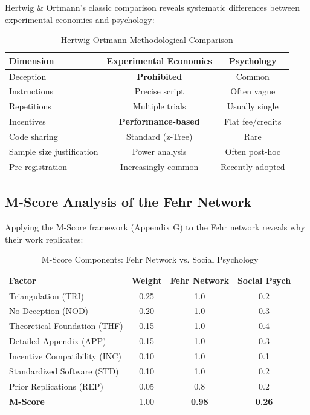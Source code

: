 \documentclass[11pt,a4paper]{article}
\theoremstyle{remark}
\begin{document}
Hertwig \& Ortmann's classic comparison reveals systematic differences between experimental economics and psychology:

\begin{table}[h]
\centering
\caption{Hertwig-Ortmann Methodological Comparison}
\label{tab:hertwig-ortmann}
\begin{tabular}{lcc}
\toprule
\textbf{Dimension} & \textbf{Experimental Economics} & \textbf{Psychology} \\
\midrule
Deception & \textbf{Prohibited} & Common \\
Instructions & Precise script & Often vague \\
Repetitions & Multiple trials & Usually single \\
Incentives & \textbf{Performance-based} & Flat fee/credits \\
Code sharing & Standard (z-Tree) & Rare \\
Sample size justification & Power analysis & Often post-hoc \\
Pre-registration & Increasingly common & Recently adopted \\
\bottomrule
\end{tabular}
\end{table}

\subsection{M-Score Analysis of the Fehr Network}

Applying the M-Score framework (Appendix G) to the Fehr network reveals why their work replicates:

\begin{table}[h]
\centering
\caption{M-Score Components: Fehr Network vs. Social Psychology}
\label{tab:mscore-comparison}
\begin{tabular}{lccc}
\toprule
\textbf{Factor} & \textbf{Weight} & \textbf{Fehr Network} & \textbf{Social Psych} \\
\midrule
Triangulation (TRI) & 0.25 & 1.0 & 0.2 \\
No Deception (NOD) & 0.20 & 1.0 & 0.3 \\
Theoretical Foundation (THF) & 0.15 & 1.0 & 0.4 \\
Detailed Appendix (APP) & 0.15 & 1.0 & 0.3 \\
Incentive Compatibility (INC) & 0.10 & 1.0 & 0.1 \\
Standardized Software (STD) & 0.10 & 1.0 & 0.2 \\
Prior Replications (REP) & 0.05 & 0.8 & 0.2 \\
\midrule
\textbf{M-Score} & 1.00 & \textbf{0.98} & \textbf{0.26} \\
\bottomrule
\end{tabular}
\end{table}
\end{document}
